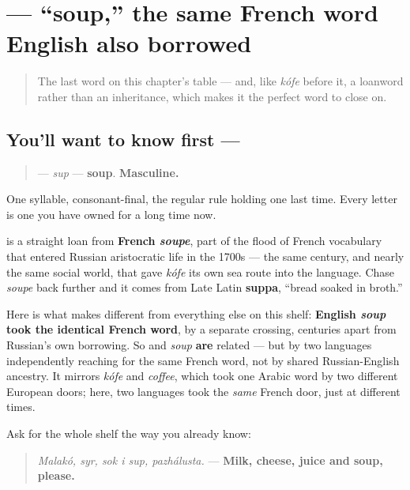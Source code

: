 \section[\texorpdfstring{\ru{суп} (sup)}{суп (sup)}]{ — \textquotedblleft{}soup,\textquotedblright{} the same French word English also borrowed}

\label{lesson:RU-C13-sup}



\begin{quote}
The last word on this chapter's table — and, like \emph{kófe} before it, a loanword rather than an inheritance, which makes it the perfect word to close on.
\end{quote}

\subsection*{You'll want to know first — }
\begin{quote}
\textbf{} — \emph{sup} — \textbf{soup}. \textbf{Masculine.}
\end{quote}

One syllable, consonant-final, the regular rule holding one last time. Every letter is one you have owned for a long time now.

\begin{cousinweb}
\textbf{} is a straight loan from \textbf{French \emph{soupe}}, part of the flood of French vocabulary that entered Russian aristocratic life in the 1700s — the same century, and nearly the same social world, that gave \emph{kófe} its own sea route into the language. Chase \emph{soupe} back further and it comes from Late Latin \textbf{suppa}, \textquotedblleft{}bread soaked in broth.\textquotedblright{}

Here is what makes \emph{} different from everything else on this shelf: \textbf{English \emph{soup} took the identical French word}, by a separate crossing, centuries apart from Russian's own borrowing. So \emph{} and \emph{soup} \textbf{are} related — but by two languages independently reaching for the same French word, not by shared Russian-English ancestry. It mirrors \emph{kófe} and \emph{coffee}, which took one Arabic word by two different European doors; here, two languages took the \emph{same} French door, just at different times.

Ask for the whole shelf the way you already know:

\begin{quote}
\emph{Malakó, syr, sok i sup, pazhálusta.} — \textbf{Milk, cheese, juice and soup, please.}
\end{quote}
\end{cousinweb}

